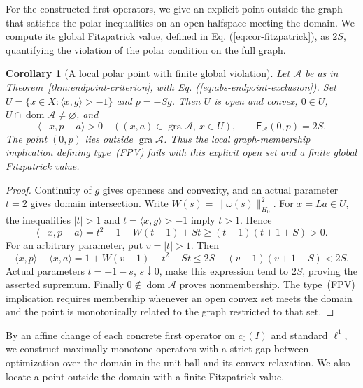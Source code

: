 \documentclass[11pt]{article}
\newcommand{\gra}{\operatorname{gra}}
\newcommand{\dom}{\operatorname{dom}}
\newcommand{\pair}[2]{\langle #1,#2\rangle}
\newtheorem{corollary}{Corollary}
\theoremstyle{definition}
\theoremstyle{remark}
\begin{document}
For the constructed first operators, we give an explicit point outside the graph that satisfies the polar inequalities on an open halfspace meeting the domain. We compute its global Fitzpatrick value, defined in Eq. (\ref{eq:cor-fitzpatrick}), as $2S$, quantifying the violation of the polar condition on the full graph.

\begin{corollary}[A local polar point with finite global violation]
\label{cor:local-polar-recovered}
Let $\mathcal A$ be as in Theorem~\ref{thm:endpoint-criterion}, with Eq. (\ref{eq:abs-endpoint-exclusion}). Set $U=\{x\in X:\pair{x}{g}>-1\}$ and $p=-Sg$. Then $U$ is open and convex, $0\in U$, $U\cap\dom\mathcal A\ne\varnothing$, and
\[
\pair{-x}{p-a}>0\quad((x,a)\in\gra\mathcal A,\ x\in U),
\qquad \mathsf F_{\mathcal A}(0,p)=2S.
\]
The point $(0,p)$ lies outside $\gra\mathcal A$. Thus the local graph-membership implication defining type~(FPV) fails with this explicit open set and a finite global Fitzpatrick value.
\end{corollary}
\begin{proof}
Continuity of $g$ gives openness and convexity, and an actual parameter $t=2$ gives domain intersection. Write $W(s)=\|\omega(s)\|_{H_0}^2$. For $x=La\in U$, the inequalities $|t|>1$ and $t=\pair{x}{g}>-1$ imply $t>1$. Hence
\[
\pair{-x}{p-a}=t^2-1-W(t-1)+St
\ge(t-1)(t+1+S)>0.
\]
For an arbitrary parameter, put $v=|t|>1$. Then
\[
\pair{x}{p}-\pair{x}{a}
=1+W(v-1)-t^2-St
\le2S-(v-1)(v+1-S)<2S.
\]
Actual parameters $t=-1-s$, $s\downarrow0$, make this expression tend to $2S$, proving the asserted supremum. Finally $0\notin\dom\mathcal A$ proves nonmembership. The type~(FPV) implication requires membership whenever an open convex set meets the domain and the point is monotonically related to the graph restricted to that set.
\end{proof}

By an affine change of each concrete first operator on $c_0(I)$ and standard $\ell^1$, we construct maximally monotone operators with a strict gap between optimization over the domain in the unit ball and its convex relaxation. We also locate a point outside the domain with a finite Fitzpatrick value.
\end{document}
